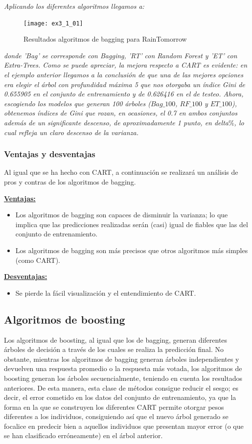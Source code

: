 \documentclass[12pt,twoside]{article}
\begin{document}
\textit{Aplicando los diferentes algoritmos llegamos a: }

\begin{figure}[h]
\centering
\texttt{[image: ex3\_1\_01]}
\caption{Resultados algoritmos de bagging para RainTomorrow}
\end{figure}

\noindent
\textit{donde 'Bag' se corresponde con Bagging, 'RT' con Random Forest y 'ET' con Extra-Trees. Como se puede apreciar, la mejora respecto a CART es evidente: en el ejemplo anterior llegamos a la conclusión de que una de las mejores opciones era elegir el árbol con profundidad máxima 5 que nos otorgaba un índice Gini de 0.655905 en el conjunto de entrenamiento y de 0.626416 en el de testeo. Ahora, escogiendo los modelos que generan 100 árboles ($Bag\_100$, $RF\_100$ y $ET\_100$), obtenemos índices de Gini que rozan, en ocasiones, el 0.7 en ambos conjuntos además de un significante descenso, de aproximadamente 1 punto, en delta$\%$, lo cual refleja un claro descenso de la varianza.}


\subsubsection{Ventajas y desventajas}
Al igual que se ha hecho con CART, a continuación se realizará un análisis de pros y contras de los algoritmos de bagging.

\textbf{\underline{Ventajas:}}
\begin{itemize}
\item Los algoritmos de bagging son capaces de disminuir la varianza; lo que implica que las predicciones realizadas serán (casi) igual de fiables que las del conjunto de entrenamiento.
\item Los algoritmos de bagging son más precisos que otros algoritmos más simples (como CART).
\end{itemize}

\textbf{\underline{Desventajas:}}
\begin{itemize}
\item Se pierde la fácil visualización y el entendimiento de CART.
\end{itemize}


\newpage
\subsection{Algoritmos de boosting}
Los algoritmos de boosting, al igual que los de bagging, generan diferentes árboles de decisión a través de los cuales se realiza la predicción final. No obstante, mientras los algoritmos de bagging generan árboles independientes y devuelven una respuesta promedio o la respuesta más votada, los algoritmos de boosting generan los árboles secuencialmente, teniendo en cuenta los resultados anteriores. De esta manera, esta clase de métodos consigue reducir el sesgo; es decir, el error cometido en los datos del conjunto de entrenamiento, ya que la forma en la que se construyen los diferentes CART permite otorgar pesos diferentes a los individuos, consiguiendo así que el nuevo árbol generado se focalice en predecir bien a aquellos individuos que presentan mayor error (o que se han clasificado erróneamente) en el árbol anterior.
\end{document}
